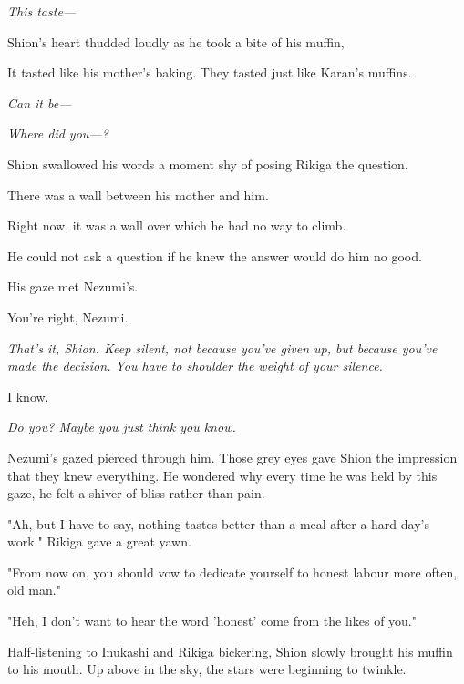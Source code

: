 \emph{This taste---}

Shion's heart thudded loudly as he took a bite of his muffin,

It tasted like his mother's baking. They tasted just like Karan's
muffins.

\emph{Can it be---}

\emph{Where did you---?}

Shion swallowed his words a moment shy of posing Rikiga the question.

There was a wall between his mother and him.

Right now, it was a wall over which he had no way to climb.

He could not ask a question if he knew the answer would do him no good.

His gaze met Nezumi's.

You're right, Nezumi.

\emph{That's it, Shion. Keep silent, not because you've given up, but because
you've made the decision. You have to shoulder the weight of your
silence.}

I know.

\emph{Do you? Maybe you just think you know.}

Nezumi's gazed pierced through him. Those grey eyes gave Shion the
impression that they knew everything. He wondered why every time he was
held by this gaze, he felt a shiver of bliss rather than pain.

"Ah, but I have to say, nothing tastes better than a meal after a hard
day's work." Rikiga gave a great yawn.

"From now on, you should vow to dedicate yourself to honest labour more
often, old man."

"Heh, I don't want to hear the word 'honest' come from the likes of
you."

Half-listening to Inukashi and Rikiga bickering, Shion slowly brought
his muffin to his mouth. Up above in the sky, the stars were beginning
to twinkle.